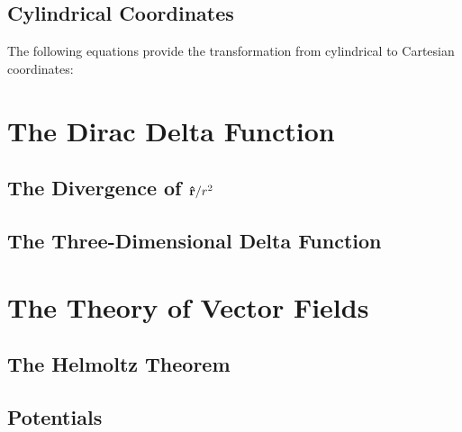 \subsection{Cylindrical Coordinates}
The following equations provide the transformation from cylindrical to Cartesian coordinates: 
  
\section{The Dirac Delta Function}

\subsection{The Divergence of $\vu{r}/r^2$}

\subsection{The Three-Dimensional Delta Function}
    

\section{The Theory of Vector Fields}

\subsection{The Helmoltz Theorem}

\subsection{Potentials}
        